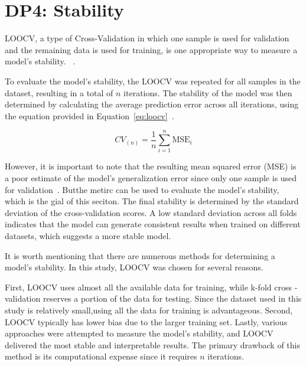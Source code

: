 \section{DP4: Stability}\label{sec:stability}

LOOCV, a type of Cross-Validation in which one sample is used for validation and the remaining data is used for
training, is one appropriate way to measure a model's stability.
~\cite[p. 200--201]{gareth2013introduction}.

To evaluate the model's stability, the \ac{LOOCV} was repeated for all samples in the dataset, resulting in a total
of $n$ iterations.
The stability of the model was then determined by calculating the average prediction error across all iterations,
using the equation provided in Equation~\ref{eq:loocv}~\cite[p. 201]{gareth2013introduction}.

\begin{tcolorbox}[arc=0pt,boxrule=0.5pt]
    \begin{equation}
        CV_{(n)} = \frac{1}{n} \sum_{i=1}^{n} \text{MSE}_{i}\label{eq:loocv}
    \end{equation}
\end{tcolorbox}

However, it is important to note that the resulting mean squared error (\ac{MSE}) is a poor estimate of the model's
generalization error since only one sample is used for validation~\cite[p. 201]{gareth2013introduction}.
Butthe metirc can be used to evaluate the model's stability, which is the gial of this seciton.
The final stability is determined by the standard deviation of the cross-validation scores.
A low standard deviation across all folds indicates that the model can generate consistent results when trained on
different datasets, which suggests a more stable model.


It is worth mentioning that there are numerous methods for determining a model's stability.
In this study, \ac{LOOCV} was chosen for several reasons.

First, \ac{LOOCV} uses almost all the available data for training, while k-fold cross -validation reserves a portion
of the data for testing.
Since the dataset used in this study is relatively small,using all the data for training is advantageous.
Second, \ac{LOOCV} typically has lower bias due to the larger training set.
Lastly, various approaches were attempted to measure the model's stability, and \ac{LOOCV} delivered
the most stable and interpretable results.
The primary drawback of this method is its computational expense since it
requires $n$ iterations.

